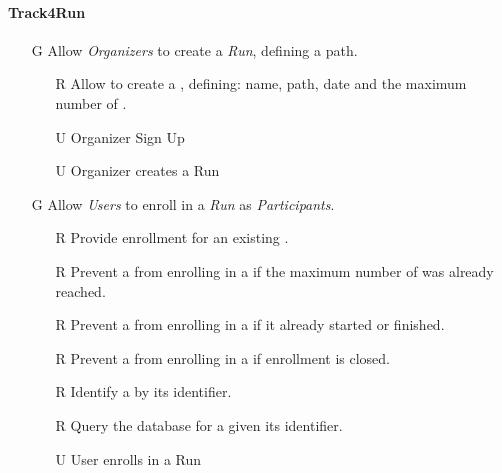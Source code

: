 \documentclass[../../rasd.tex]{subfiles}
\begin{document}
        \paragraph{Track4Run}
        \begin{itemize}
            \item[G\subs{8}]Allow \textit{Organizers} to create a \textit{Run}, defining a path.
            \begin{itemize}
                \item[R\subs{39}]Allow  to create a , defining: name, path, date and the maximum number of . 
                \\
                \item[U\subs{12}]Organizer Sign Up
                \item[U\subs{13}]Organizer creates a Run
            \end{itemize}

            \item[G\subs{9}]Allow \textit{Users} to enroll in a \textit{Run} as \textit{Participants}. 
            \begin{itemize}
                \item[R\subs{40}]Provide  enrollment for an existing .
                \item[R\subs{41}]Prevent a  from enrolling in a  if the maximum number of  was already reached.
                \item[R\subs{42}]Prevent a  from enrolling in a  if it already started or finished.
                \item[R\subs{43}]Prevent a  from enrolling in a  if enrollment is closed.
                \item[R\subs{45}]Identify a  by its identifier.
                \item[R\subs{46}]Query the database for a  given its identifier.
                \\
                \item[U\subs{14}]User enrolls in a Run
            \end{itemize}


\end{itemize}
\end{document}
